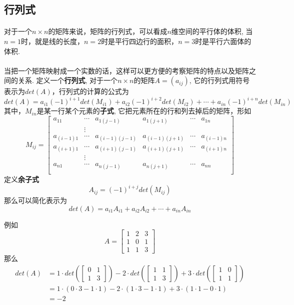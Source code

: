 \subsection{行列式}
\paragraph{}
对于一个$n\times n$的矩阵来说，矩阵的行列式，可以看成$n$维空间的平行体的体积, 当$n = 1$时，就是线的长度，$n = 2$时是平行四边行的面积，$n = 3$时是平行六面体的体积.

\paragraph{}
当把一个矩阵映射成一个实数的话，这样可以更方便的考察矩阵的特点以及矩阵之间的关系.  定义一个\textbf{行列式}, 对于一个$n\times n$的矩阵$A = (a_{ij})$, 它的行列式用符号表示为$det(A)$，行列式的计算的公式为
$$
det(A) = a_{i1}(-1)^{i+1} det(M_{i1}) + a_{i2} (-1)^{i+2} det(M_{i2}) + \cdots +  a_{in} (-1)^{i+n} det(M_{in})
$$
其中，$M_{in}$是某一行某个元素的\textbf{子式}, 它把元素所在的行和列去掉后的矩阵，形如
$$
M_{ij} = \begin{bmatrix}
a_{11} & \cdots & a_{1(j-1)} & a_{1(j+1)} & \cdots & a_{1n} \\
 & \vdots &  &  &  \\
a_{(i-1)1} & \cdots & a_{(i-1)(j-1)} & a_{(i-1)(j+1)} & \cdots & a_{(i - 1)n} \\
a_{(i+1)1} & \cdots & a_{(i+1)(j-1)} & a_{(i+1)(j+1)} & \cdots & a_{(i + 1)n} \\
 & \vdots &  &  &  \\
 a_{n1} & \cdots & a_{n(j-1)} & a_{n(j+1)} & \cdots & a_{nn} \\
\end{bmatrix}
$$
定义\textbf{余子式}
$$
A_{ij} = (-1)^{i+j}det(M_{ij})
$$
那么可以简化表示为
$$
det(A) = a_{i1}A_{i1} + a_{i2}A_{i2} + \cdots + a_{in}A_{in}
$$

例如
$$
A = \begin{bmatrix}
1 & 2 & 3 \\
1 & 0 & 1 \\
1 & 1 & 3
\end{bmatrix}
$$
那么
\begin{align*}
det(A) &= 1 \cdot det(\begin{bmatrix}
0 & 1 \\
1 & 3
\end{bmatrix}) - 2 \cdot det(\begin{bmatrix}
1 & 1 \\
1 & 3
\end{bmatrix}) + 3 \cdot det(\begin{bmatrix}
1 & 0 \\
1 & 1
\end{bmatrix})  \\
& = 1 \cdot (0 \cdot 3 - 1 \cdot 1) - 2 \cdot (1 \cdot 3 - 1 \cdot 1) + 3 \cdot (1 \cdot 1 - 0 \cdot 1)  \\
& = -2
\end{align*}

